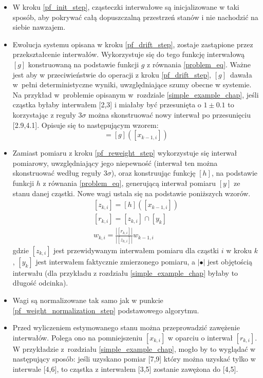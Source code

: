 \begin{itemize}
	\item W kroku \ref{pf_init_step}, cząsteczki interwałowe są inicjalizowane w taki sposób, aby pokrywać całą dopuszczalną przestrzeń stanów i nie nachodzić na siebie nawzajem.
	\item Ewolucja systemu opisana w kroku \ref{pf_drift_step}, zostaje zastąpione przez przekształcenie interwałów. Wykorzystuje się do tego funkcję interwałową $[g]$ konstruowaną na podstawie funkcji $g$ z równania \ref{problem_eq}. Ważne jest aby w przeciwieństwie do operacji z kroku \ref{pf_drift_step}, $[g]$~dawała w~pełni deterministyczne wyniki, uwzględniające szumy obecne w systemie. Na przykład w~problemie opisanym w~rozdziale \ref{simple_example_chap}, jeśli cząstka byłaby interwałem [2,3] i miałaby być przesunięta o $1\pm 0.1$ to korzystając z reguły $3\sigma$ \cite{3_sigma_rule} można skonstruować nowy interwał po przesunięciu [2.9,4.1]. Opisuje się to następującym wzorem:
	\begin{equation}
		[x_{k,i}] = [g]([x_{k-1,i}])
	\end{equation}
	
	\item Zamiast pomiaru z kroku \ref{pf_reweight_step} wykorzystuje się interwał pomiarowy, uwzględniający jego niepewność (interwał ten można skonstruować według reguły $3\sigma$), oraz konstruując funkcję $[h]$, na podstawie funkcji $h$ z równania \ref{problem_eq}, generującą interwał pomiaru $[y]$ ze stanu danej cząstki. Nowe wagi ustala się na podstawie poniższych wzorów.
	\begin{equation}
		\begin{aligned}
			[z_{k,i}] = [h]([x_{k-1,i}])\\
			[r_{k,i}] = [z_{k,i}] \cap [y_{k}]\\
			w_{k,i} = \frac{|[r_{k,i}]|}{|[z_{k,i}]|} w_{k-1,i}
		\end{aligned}
	\end{equation}
	gdzie $[z_{k,i}]$ jest przewidywanym interwałem pomiaru dla cząstki $i$ w kroku $k$, $[y_{k}]$ jest interwałem faktycznie zmierzonego pomiaru, a $|\bullet|$ jest objętością interwału (dla przykładu z rozdziału \ref{simple_example_chap} byłaby to długość odcinka).
	\item Wagi są normalizowane tak samo jak w punkcie \ref{pf_weight_normalization_step} podstawowego algorytmu.
	
	\item Przed wyliczeniem estymowanego stanu można przeprowadzić zawężenie interwałów. Polega ono na pomniejszeniu $[x_{k,i}]$ w oparciu o interwał $[r_{k,i}]$. W przykładzie z~rozdziału \ref{simple_example_chap}, mogło by to wyglądać w następujący sposób: jeśli uzyskano pomiar [7,9] który można uzyskać tylko w interwale [4,6], to cząstka z interwałem [3,5] zostanie zawężona do [4,5].
	

\end{itemize}
